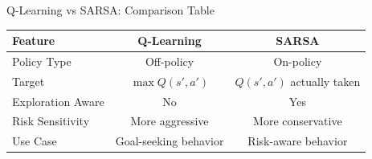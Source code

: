 \begin{frame}{Q-Learning vs SARSA: Comparison Table}
    \begin{table}[h!]
        \centering
        \renewcommand{\arraystretch}{2.5}
        \begin{tabular}{lcc}
            \hline
            \textbf{Feature} & \textbf{Q-Learning} & \textbf{SARSA} \\
            \hline
            Policy Type & Off-policy & On-policy \\
            Target & $\max Q(s', a')$ & $Q(s', a')$ actually taken \\
            Exploration Aware & No & Yes \\
            Risk Sensitivity & More aggressive & More conservative \\
            Use Case & Goal-seeking behavior & Risk-aware behavior \\
            \hline
        \end{tabular}
    \end{table}
\end{frame}